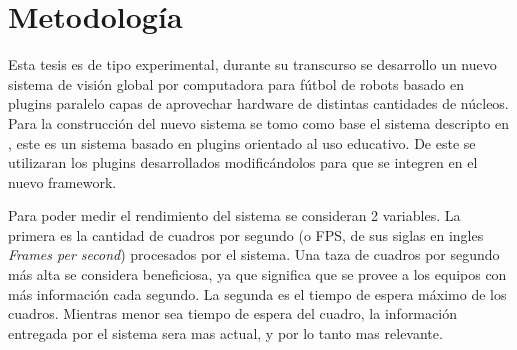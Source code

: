 
\section{Metodología}

Esta tesis es de tipo experimental, durante su transcurso se desarrollo un
nuevo sistema de visión global por computadora para fútbol de robots basado en
plugins paralelo capas de aprovechar hardware de distintas cantidades de
núcleos. Para la construcción del nuevo sistema se tomo como base el sistema
descripto en \cite{torres2014}, este es un sistema basado en plugins orientado
al uso educativo. De este se utilizaran los plugins desarrollados modificándolos
para que se integren en el nuevo framework.

Para poder medir el rendimiento del sistema se consideran 2 variables. La
primera es la cantidad de cuadros por segundo (o FPS, de sus siglas en ingles
\emph{Frames per second}) procesados por el sistema. Una taza de cuadros por
segundo más alta se considera beneficiosa, ya que significa que se provee a los
equipos con más información cada segundo. La segunda es el tiempo de espera
máximo de los cuadros. Mientras menor sea tiempo de espera del cuadro, la
información entregada por el sistema sera mas actual, y por lo tanto mas
relevante.
